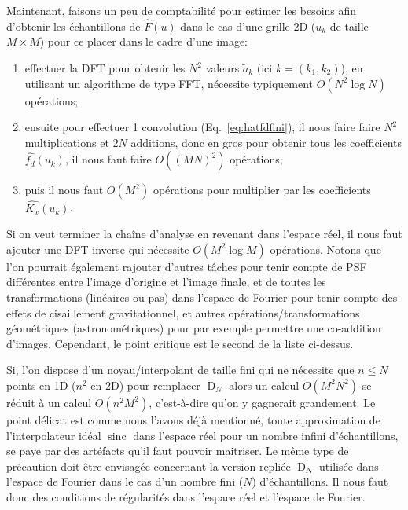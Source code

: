 \documentclass[11pt,twoside]{article}
\DeclareMathOperator{\sinc}{sinc}
\DeclareMathOperator{\D}{D}
\DeclareMathOperator{\comb}{\raisebox{\depth}{\rotatebox{270}{$\exists$}}}
\begin{document}

Maintenant, faisons un peu de comptabilité pour estimer les besoins afin d'obtenir les échantillons de $\hat{F}(u)$ dans le cas d'une grille 2D ($u_k$ de taille $M\times M$) pour  ce placer dans le cadre d'une image:
\begin{enumerate}
\item effectuer la DFT pour obtenir les $N^2$ valeurs $\tilde{a}_{k}$ (ici $k=(k_1,k_2)$), en utilisant un algorithme de type FFT, nécessite typiquement $O(N^2\log N)$ opérations;
\item ensuite pour effectuer 1 convolution (Eq.~\ref{eq:hatfdfini}), il nous faire faire $N^2$ multiplications et $2N$ additions, donc en gros pour obtenir tous les coefficients $\hat{f_d}(u_k)$, il nous faut faire $O((MN)^2)$ opérations;
\item puis il nous faut $O(M^2)$ opérations pour multiplier par les coefficients $\hat{K_x}(u_k)$.
\end{enumerate}
Si on veut terminer la chaîne d'analyse en revenant dans l'espace réel, il nous faut ajouter une DFT inverse qui nécessite $O(M^2\log M)$ opérations. Notons que l'on pourrait également rajouter d'autres tâches pour tenir compte de PSF différentes entre l'image d'origine et l'image finale, et de toutes les transformations (linéaires ou pas) dans l'espace de Fourier pour tenir compte des effets de cisaillement gravitationnel, et autres opérations/transformations géométriques (astronométriques) pour par exemple permettre une co-addition d'images. Cependant, le point critique est le second de la liste ci-dessus.

Si, l'on dispose d'un noyau/interpolant de taille fini qui ne nécessite que $n\leq N$ points en 1D ($n^2$ en 2D) pour remplacer $\D_N$ alors un calcul $O(M^2N^2)$ se réduit à  un calcul $O(n^2 M^2)$, c'est-à-dire qu'on y gagnerait grandement. Le point délicat est comme nous l'avons déjà mentionné, toute approximation de l'interpolateur idéal $\sinc$ dans l'espace réel pour un nombre infini d'échantillons, se paye par des artéfacts qu'il faut pouvoir maitriser.  Le même type de précaution doit être envisagée concernant la version repliée $\D_N$ utilisée dans l'espace de Fourier dans le cas d'un nombre fini ($N$) d'échantillons. Il nous faut donc des conditions de régularités dans l'espace réel et l'espace de Fourier. 
%
\end{document}
